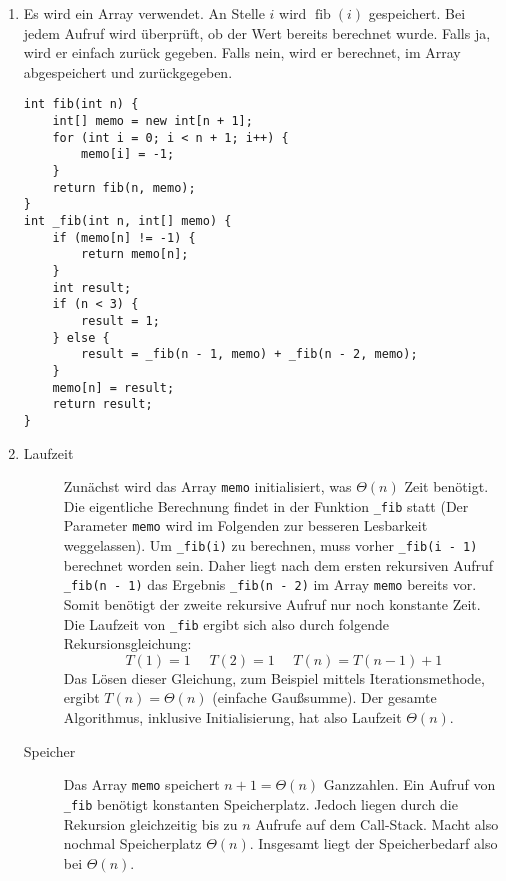 \documentclass[11pt,a4paper]{article}
\begin{document}
\begin{loesung}
    \begin{enumerate}
        \item Es wird ein Array verwendet. An Stelle $i$ wird $\operatorname{fib}(i)$ gespeichert.
        Bei jedem Aufruf wird überprüft, ob der Wert bereits berechnet wurde.
        Falls ja, wird er einfach zurück gegeben.
        Falls nein, wird er berechnet, im Array abgespeichert und zurückgegeben.
        \newline
        \begin{minipage}{\linewidth}
        \begin{lstlisting}
int fib(int n) {
    int[] memo = new int[n + 1];
    for (int i = 0; i < n + 1; i++) {
        memo[i] = -1;
    }
    return fib(n, memo);
}
int _fib(int n, int[] memo) {
    if (memo[n] != -1) {
        return memo[n];
    }
    int result;
    if (n < 3) {
        result = 1;
    } else {
        result = _fib(n - 1, memo) + _fib(n - 2, memo);
    }
    memo[n] = result;
    return result;
}
        \end{lstlisting}
        \end{minipage}

        \item
        \begin{description}
            \item[Laufzeit] 
            Zunächst wird das Array \texttt{memo} initialisiert, was $\Theta(n)$ Zeit benötigt.
            Die eigentliche Berechnung findet in der Funktion \texttt{\_fib} statt (Der Parameter \texttt{memo} wird im Folgenden zur besseren Lesbarkeit weggelassen).
            Um \texttt{\_fib(i)} zu berechnen, muss vorher \texttt{\_fib(i - 1)} berechnet worden sein.
            Daher liegt nach dem ersten rekursiven Aufruf \texttt{\_fib(n - 1)} das Ergebnis \texttt{\_fib(n - 2)} im Array \texttt{memo} bereits vor.
            Somit benötigt der zweite rekursive Aufruf nur noch konstante Zeit.
            Die Laufzeit von \texttt{\_fib} ergibt sich also durch folgende Rekursionsgleichung:
            \begin{equation*}
                T(1) = 1 \,\,\,\,\,\,\,\, T(2) = 1 \,\,\,\,\,\,\,\, T(n) = T(n - 1) + 1
            \end{equation*}
            Das Lösen dieser Gleichung, zum Beispiel mittels Iterationsmethode, ergibt $T(n) = \Theta(n)$ (einfache Gaußsumme).
            Der gesamte Algorithmus, inklusive Initialisierung, hat also Laufzeit $\Theta(n)$.
            \item[Speicher]
            Das Array \texttt{memo} speichert $n + 1 = \Theta(n)$ Ganzzahlen.
            Ein Aufruf von \texttt{\_fib} benötigt konstanten Speicherplatz.
            Jedoch liegen durch die Rekursion gleichzeitig bis zu $n$ Aufrufe auf dem Call-Stack.
            Macht also nochmal Speicherplatz $\Theta(n)$.
            Insgesamt liegt der Speicherbedarf also bei $\Theta(n)$.
        \end{description}
        

\end{enumerate}
\end{loesung}
\end{document}
